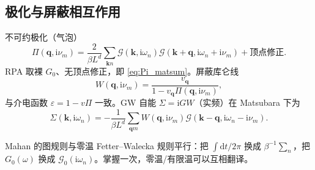 \subsection{极化与屏蔽相互作用}

不可约极化（气泡）
\begin{equation}
  \Pi(\mathbf{q},\mathrm{i}\nu_m)
  =\frac{2}{\beta L^d}
  \sum_{\mathbf{k}n}
  \mathcal{G}(\mathbf{k},\mathrm{i}\omega_n)
  \mathcal{G}(\mathbf{k}+\mathbf{q},\mathrm{i}\omega_n+\mathrm{i}\nu_m)
  +\text{顶点修正}.
\end{equation}
RPA 取裸 $G_0$、无顶点修正，即 \eqref{eq:Pi_matsum}。屏蔽库仑线
\begin{equation}
  W(\mathbf{q},\mathrm{i}\nu_m)
  =\frac{v_{\mathbf{q}}}{1-v_{\mathbf{q}}\Pi(\mathbf{q},\mathrm{i}\nu_m)},
\end{equation}
与介电函数 $\varepsilon=1-v\Pi$ 一致。GW 自能 $\Sigma=\mathrm{i}G W$（实频）在 Matsubara 下为
\begin{equation}
  \Sigma(\mathbf{k},\mathrm{i}\omega_n)
  =-\frac{1}{\beta L^d}
  \sum_{\mathbf{q}m}
  W(\mathbf{q},\mathrm{i}\nu_m)
  \mathcal{G}(\mathbf{k}-\mathbf{q},\mathrm{i}\omega_n-\mathrm{i}\nu_m).
\end{equation}

\begin{note}
Mahan 的图规则与零温 Fetter--Walecka 规则平行：把 $\int\mathrm{d}t/2\pi$ 换成 $\beta^{-1}\sum_n$，把 $G_0(\omega)$ 换成 $\mathcal{G}_0(\mathrm{i}\omega_n)$。掌握一次，零温/有限温可以互相翻译。
\end{note}
